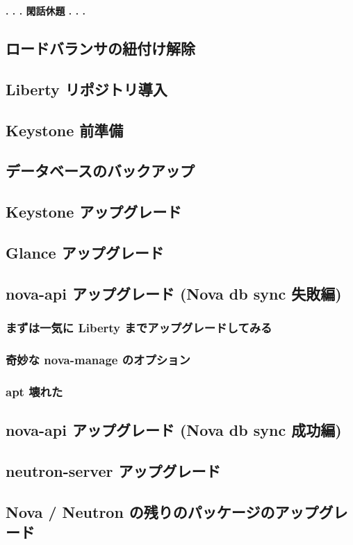 \documentclass[9pt,b5paper,tombo,openany]{jsbook}
\begin{document}
\noindent
{\bf . . . 閑話休題 . . . }

\subsection{ロードバランサの紐付け解除}
\subsection{Liberty リポジトリ導入}
\subsection{Keystone 前準備}
\subsection{データベースのバックアップ}
\subsection{Keystone アップグレード}
\subsection{Glance アップグレード}
\subsection{nova-api アップグレード (Nova db sync 失敗編)}
\subsubsection{まずは一気に Liberty までアップグレードしてみる}
\subsubsection{奇妙な nova-manage のオプション}
\subsubsection{apt 壊れた}

\subsection{nova-api アップグレード (Nova db sync 成功編)}
\subsection{neutron-server アップグレード}
\subsection{Nova / Neutron の残りのパッケージのアップグレード}
\end{document}
